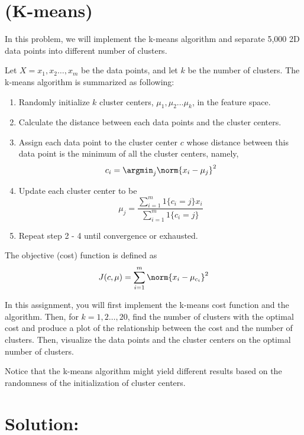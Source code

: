 \documentclass[189]{pset}
\begin{document}

  \section{(K-means)}
    In this problem, we will implement the k-means algorithm and
    separate 5,000 2D data points into different number of clusters.

    Let $X = {x_1, x_2 \ldots, x_m} $ be the data points, and let $k$
    be the number of clusters. The k-means algorithm is summarized as
    following:
    \begin{enumerate}[label=\arabic*.]
      \item Randomly initialize $k$ cluster centers, $\mu_1, \mu_2
        \ldots \mu_k$, in the feature space.
      \item Calculate the distance between each data points and the
        cluster centers.
      \item Assign each data point to the cluster center $c$ whose
        distance between this data point is the minimum of all the
        cluster centers, namely,
        \[
          c_i = \argmin_j \norm{x_i - \mu_j}^2
        \]
      \item Update each cluster center to be
        \[
          \mu_j = \frac{\sum_{i=1}^{m}1\{c_i = j\}x_i}{\sum_{i =
              1}^{m}1\{c_i = j\}}
        \]
      \item Repeat step 2 - 4 until convergence or exhausted.
    \end{enumerate}

    The objective (cost) function is defined as
    \[
      J(c, \mu) = \sum_{i = 1}^{m} \norm{x_i - \mu_{c_i}}^2
    \]

    In this assignment, you will first implement the k-means cost
    function and the algorithm. Then, for $k = 1, 2 \ldots, 20$, find
    the number of clusters with the optimal cost and produce a plot of
    the relationship between the cost and the number of clusters.
    Then, visualize the data points and the cluster centers on the
    optimal number of clusters.

    Notice that the k-means algorithm might yield different results
    based on the randomness of the initialization of cluster centers.

  \hrulefill

  \section*{Solution:}
  \begin{enumerate}
  \end{enumerate}
\end{document}
